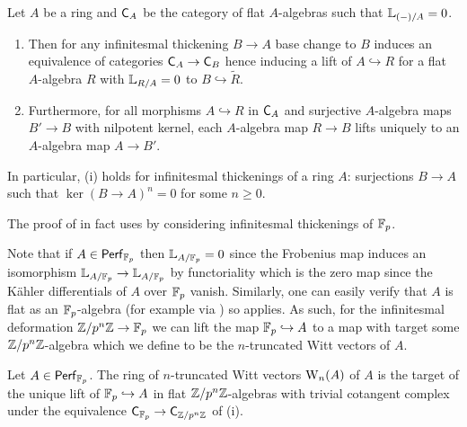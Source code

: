 \begin{theorem}\label{thm: main result of deformation theory}
    Let $A$ be a ring and $\mathsf{C}_{A}$ be the category of flat $A$-algebras such that $\mathbb{L}_{(-)/A}=0$.
    \begin{enumerate}[label=(\roman*)]
        \item Then for any infinitesmal thickening $B\to A$ base change to $B$ induces an equivalence of categories $\mathsf{C}_{A}\to\mathsf{C}_{B}$ hence inducing a lift of $A\hookrightarrow R$ for a flat $A$-algebra $R$ with $\mathbb{L}_{R/A}=0$ to $B\hookrightarrow\widetilde{R}$. 
        \item Furthermore, for all morphisms $A\hookrightarrow R$ in $\mathsf{C}_{A}$ and surjective $A$-algebra maps $B'\to B$ with nilpotent kernel, each $A$-algebra map $R\to B$ lifts uniquely to an $A$-algebra map $A\to B'$.
    \end{enumerate}
\end{theorem}
\begin{remark}
    In particular,  (i) holds for infinitesmal thickenings of a ring $A$: surjections $B\to A$ such that $\ker(B\to A)^{n}=0$ for some $n\geq0$. 
\end{remark}
\begin{remark}
    The proof of  in fact uses  by considering infinitesmal thickenings of $\mathbb{F}_{p}$. 
\end{remark}
Note that if $A\in\mathsf{Perf}_{\mathbb{F}_{p}}$ then $\mathbb{L}_{A/\mathbb{F}_{p}}=0$ since the Frobenius map induces an isomorphism $\mathbb{L}_{A/\mathbb{F}_{p}}\to\mathbb{L}_{A/\mathbb{F}_{p}}$ by functoriality which is the zero map since the K\"{a}hler differentials of $A$ over $\mathbb{F}_{p}$ vanish. Similarly, one can easily verify that $A$ is flat as an $\mathbb{F}_{p}$-algebra (for example via \cite[\href{https://stacks.math.columbia.edu/tag/00HD}{Tag 00HD (3)}]{stacks-project}) so  applies. As such, for the infinitesmal deformation $\mathbb{Z}/p^{n}\mathbb{Z}\to\mathbb{F}_{p}$ we can lift the map $\mathbb{F}_{p}\hookrightarrow A$ to a map with target some $\mathbb{Z}/p^{n}\mathbb{Z}$-algebra which we define to be the $n$-truncated Witt vectors of $A$. 
\begin{definition}\label{def: n-truncated Witt vectors}
    Let $A\in\mathsf{Perf}_{\mathbb{F}_{p}}$. The ring of $n$-truncated Witt vectors $\mathrm{W}_{n}(A)$ of $A$ is the target of the unique lift of $\mathbb{F}_{p}\hookrightarrow A$ in flat $\mathbb{Z}/p^{n}\mathbb{Z}$-algebras with trivial cotangent complex under the equivalence $\mathsf{C}_{\mathbb{F}_{p}}\to\mathsf{C}_{\mathbb{Z}/p^{n}\mathbb{Z}}$ of  (i). 
\end{definition}
